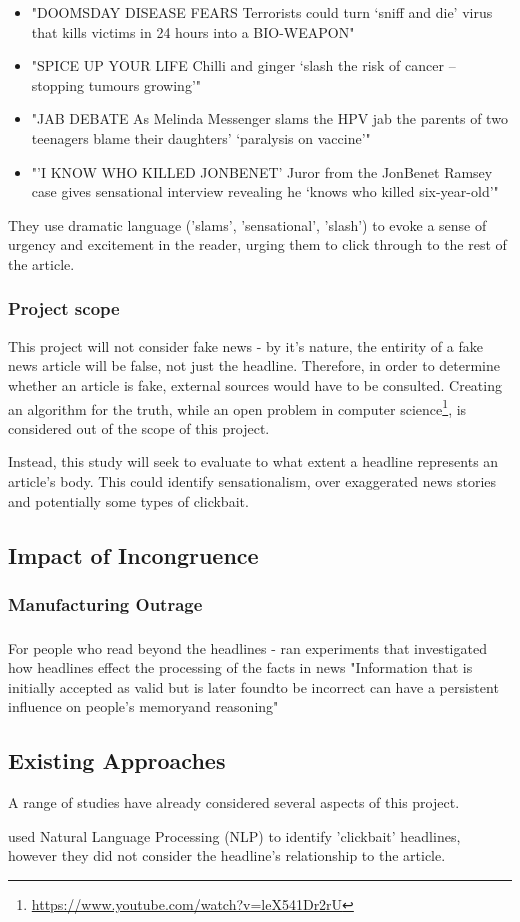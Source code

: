 \begin{itemize}
	\item "DOOMSDAY DISEASE FEARS Terrorists could turn ‘sniff and die’ virus that kills victims in 24 hours into a BIO-WEAPON"
	\item "SPICE UP YOUR LIFE Chilli and ginger ‘slash the risk of cancer – stopping tumours growing’"
	\item "JAB DEBATE As Melinda Messenger slams the HPV jab the parents of two teenagers blame their daughters’ ‘paralysis on vaccine’"
	\item "'I KNOW WHO KILLED JONBENET' Juror from the JonBenet Ramsey case gives sensational interview revealing he ‘knows who killed six-year-old’"
	
\end{itemize}

They use dramatic language ('slams', 'sensational', 'slash') to evoke a sense of urgency and excitement in the reader, urging them to click through to the rest of the article. 

\subsubsection{Project scope}
This project will not consider fake news - by it's nature, the entirity of a fake news article will be false, not just the headline. Therefore, in order to determine whether an article is fake, external sources would have to be consulted. Creating an algorithm for the truth, while an open problem in computer science\footnote{\url{https://www.youtube.com/watch?v=leX541Dr2rU}}, is considered out of the scope of this project.

Instead, this study will seek to evaluate to what extent a headline represents an article's body. This could identify sensationalism, over exaggerated news stories and potentially some types of clickbait.

\subsection{Impact of Incongruence}
\subsubsection{Manufacturing Outrage}
\subsubsection{}
For people who read beyond the headlines -  ran experiments that investigated how headlines effect the processing of the facts in news "Information that is initially accepted as valid but is later foundto be incorrect can have a persistent influence on people’s memoryand reasoning"


\subsection{Existing Approaches}
A range of studies have already considered several aspects of this project.

 used Natural Language Processing (NLP) to identify 'clickbait' headlines, however they did not consider the headline's relationship to the article.

